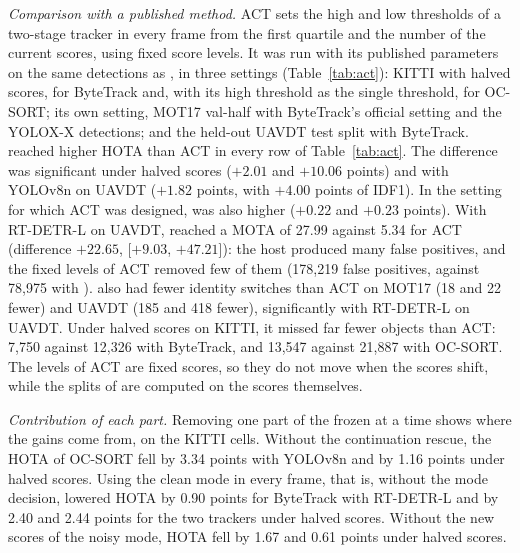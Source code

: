 \emph{Comparison with a published method.} ACT \cite{act2026adaptive} sets the high and low
thresholds of a two-stage tracker in every frame from the first quartile and the number of the
current scores, using fixed score levels. It was run with its published parameters on the same
detections as \scl{}, in three settings (Table~\ref{tab:act}): KITTI with halved scores, for
ByteTrack and, with its high threshold as the single threshold, for OC-SORT; its own setting, MOT17
val-half with ByteTrack's official setting and the YOLOX-X detections; and the held-out UAVDT test
split with ByteTrack. \scl{} reached higher HOTA than ACT in every row of Table~\ref{tab:act}. The
difference was significant under halved scores ($+2.01$ and $+10.06$ points) and with YOLOv8n on
UAVDT ($+1.82$ points, with $+4.00$ points of IDF1). In the setting for which ACT was designed,
\scl{} was also higher ($+0.22$ and $+0.23$ points). With RT-DETR-L on UAVDT, \scl{} reached a MOTA of 27.99 against
5.34 for ACT (difference $+22.65$, [$+9.03$, $+47.21$]): the host produced many false positives,
and the fixed levels of ACT removed few of them (178,219 false positives, against 78,975 with
\scl{}). \scl{} also had fewer identity switches than ACT on MOT17 (18 and 22 fewer) and UAVDT (185 and
418 fewer), significantly with RT-DETR-L on UAVDT. Under halved scores on KITTI, it missed far fewer objects than ACT:
7,750 against 12,326 with ByteTrack, and 13,547 against 21,887 with OC-SORT. The levels of ACT are fixed scores, so they do not move when the
scores shift, while the splits of \scl{} are computed on the scores themselves.

\emph{Contribution of each part.} Removing one part of the frozen \scl{} at a time shows where the
gains come from, on the KITTI cells. Without the continuation rescue, the HOTA of OC-SORT fell by
3.34 points with YOLOv8n and by 1.16 points under halved scores. Using the clean mode in every
frame, that is, without the mode decision, lowered HOTA by 0.90 points for ByteTrack with RT-DETR-L
and by 2.40 and 2.44 points for the two trackers under halved scores. Without the new scores of the
noisy mode, HOTA fell by 1.67 and 0.61 points under halved scores.




